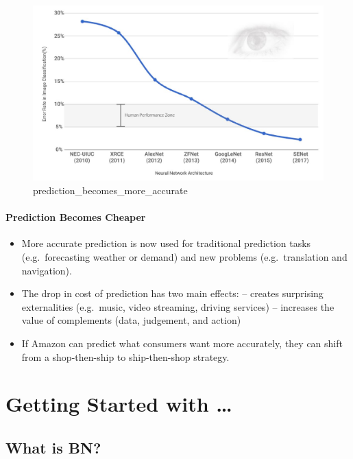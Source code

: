 \documentclass[
]{article}
\providecommand{\tightlist}{%
  \setlength{\itemsep}{0pt}\setlength{\parskip}{0pt}}
\begin{document}
\begin{figure}
\centering
\includegraphics{data/prediction_becomes_more_accurate.JPG}
\caption{prediction\_becomes\_more\_accurate}
\end{figure}

\hypertarget{prediction-becomes-cheaper}{%
\paragraph{Prediction Becomes Cheaper}\label{prediction-becomes-cheaper}}

\begin{itemize}
\tightlist
\item
  More accurate prediction is now used for traditional prediction tasks (e.g.~forecasting weather or demand) and new problems (e.g.~translation and navigation).
\item
  The drop in cost of prediction has two main effects:
  -- creates surprising externalities (e.g.~music, video streaming, driving services)
  -- increases the value of complements (data, judgement, and action)
\item
  If Amazon can predict what consumers want more accurately, they can shift from a shop-then-ship to ship-then-shop strategy.
\end{itemize}

\hypertarget{getting-started-with}{%
\section{Getting Started with \ldots{}}\label{getting-started-with}}

\hypertarget{what-is-bn}{%
\subsection{What is BN?}\label{what-is-bn}}
\end{document}
